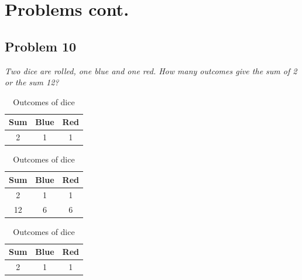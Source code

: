 \documentclass{beamer}
\begin{document}
        
\section{Problems cont.}

                
        
    \subsection{Problem 10}
    
        \begin{frame}[c,shrink]{\subsecname}
            \textit{Two dice are rolled, one blue and one red. How many outcomes give the sum of
2 or the sum 12?}
            \begin{overprint}
            \begin{table}[tp]%
                \caption{Outcomes of dice}
                \label{dicetable1}\centering%
                \begin{tabular}{ccc}
                    \hline%
                      Sum 	& Blue  & Red 	\\\hline%
                     2 	& 1	   & 1 	\\\hline%
                \end{tabular}
            \end{table}
            \begin{table}[tp]%
                \caption{Outcomes of dice}
                \label{dicetable2}\centering%
                \begin{tabular}{ccc}
                    \hline%
                      Sum 	& Blue  & Red 	\\\hline%
                     2 	& 1	   & 1 	\\\hline
                     12 	& 6	   & 6 	\\\hline%
                \end{tabular}
            \end{table}
            \begin{table}[tp]%
                \caption{Outcomes of dice}
                \label{dicetable3}\centering%
                \begin{tabular}{ccc}
                    \hline%
                      Sum 	& Blue  & Red 	\\\hline%
                     2 	& 1	   & 1 	\\\hline

\end{tabular}
\end{table}
\end{overprint}
\end{frame}
\end{document}
